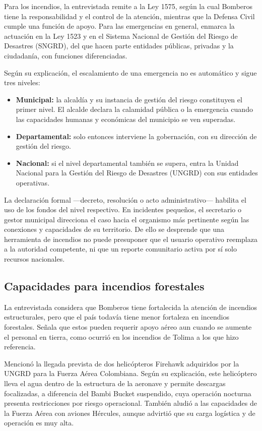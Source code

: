 Para los incendios, la entrevistada remite a la Ley 1575, según la cual Bomberos tiene la responsabilidad y el control de la atención, mientras que la Defensa Civil cumple una función de apoyo. Para las emergencias en general, enmarca la actuación en la Ley 1523 y en el Sistema Nacional de Gestión del Riesgo de Desastres (SNGRD), del que hacen parte entidades públicas, privadas y la ciudadanía, con funciones diferenciadas.

Según su explicación, el escalamiento de una emergencia no es automático y sigue tres niveles:

\begin{itemize}
  \item \textbf{Municipal:} la alcaldía y su instancia de gestión del riesgo constituyen el primer nivel. El alcalde declara la calamidad pública o la emergencia cuando las capacidades humanas y económicas del municipio se ven superadas.
  \item \textbf{Departamental:} solo entonces interviene la gobernación, con su dirección de gestión del riesgo.
  \item \textbf{Nacional:} si el nivel departamental también se supera, entra la Unidad Nacional para la Gestión del Riesgo de Desastres (UNGRD) con sus entidades operativas.
\end{itemize}

La declaración formal ---decreto, resolución o acto administrativo--- habilita el uso de los fondos del nivel respectivo. En incidentes pequeños, el secretario o gestor municipal direcciona el caso hacia el organismo más pertinente según las conexiones y capacidades de su territorio. De ello se desprende que una herramienta de incendios no puede presuponer que el usuario operativo reemplaza a la autoridad competente, ni que un reporte comunitario activa por sí solo recursos nacionales.

\subsection{Capacidades para incendios forestales}

La entrevistada considera que Bomberos tiene fortalecida la atención de incendios estructurales, pero que el país todavía tiene menor fortaleza en incendios forestales. Señala que estos pueden requerir apoyo aéreo aun cuando se aumente el personal en tierra, como ocurrió en los incendios de Tolima a los que hizo referencia.

Mencionó la llegada prevista de dos helicópteros Firehawk adquiridos por la UNGRD para la Fuerza Aérea Colombiana. Según su explicación, este helicóptero lleva el agua dentro de la estructura de la aeronave y permite descargas focalizadas, a diferencia del Bambi Bucket suspendido, cuya operación nocturna presenta restricciones por riesgo operacional. También aludió a las capacidades de la Fuerza Aérea con aviones Hércules, aunque advirtió que su carga logística y de operación es muy alta.

